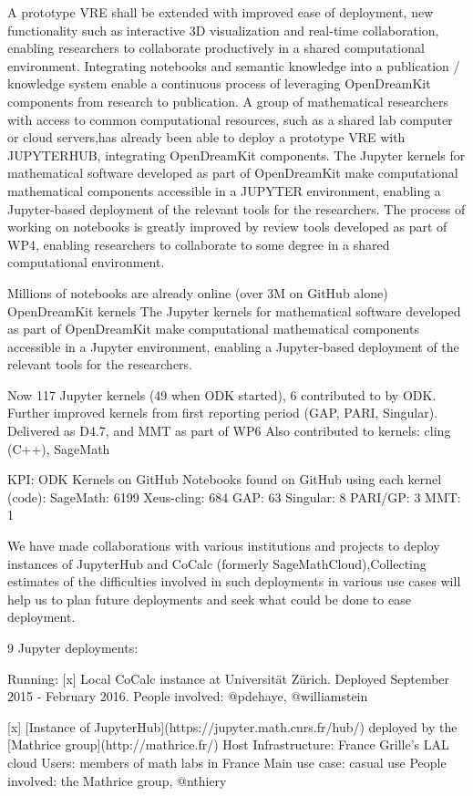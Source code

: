 \begin{Aim 1}
\begin{Aim 2}
\begin{itemize}
A prototype VRE shall be extended with improved ease of deployment, new functionality such as interactive 3D visualization and real-time 
collaboration, enabling researchers to collaborate productively in a shared computational environment. Integrating notebooks and semantic 
knowledge into a publication / knowledge system enable a continuous process of leveraging OpenDreamKit components from research to 
publication.
A group of mathematical researchers with access to common computational resources, such as a shared lab computer or cloud servers,has 
already been able to deploy a prototype VRE with JUPYTERHUB, integrating OpenDreamKit components. The Jupyter kernels for mathematical 
software developed as part of OpenDreamKit make computational mathematical components accessible in a JUPYTER environment, enabling a 
Jupyter-based deployment of the relevant tools for the researchers. The process of working on notebooks is greatly improved by review tools 
developed as part of WP4, enabling researchers to collaborate to some degree in a shared computational environment.

Millions of notebooks are already online (over 3M on GitHub alone)
OpenDreamKit kernels
The Jupyter kernels for mathematical software  developed as part of OpenDreamKit make computational mathematical components accessible in a 
Jupyter environment, enabling a Jupyter-based deployment of the relevant tools for the researchers.

Now 117 Jupyter kernels (49 when ODK started), 6 contributed to by ODK.
Further improved kernels from first reporting period (GAP, PARI, Singular). 
Delivered as D4.7, and MMT as part of WP6
Also contributed to kernels: cling (C++), SageMath

KPI: ODK Kernels on GitHub
Notebooks found on GitHub using each kernel (code):
SageMath: 6199
Xeus-cling: 684
GAP: 63
Singular: 8
PARI/GP: 3
MMT: 1

We have made collaborations with various institutions and projects to deploy instances of JupyterHub and CoCalc (formerly 
SageMathCloud),Collecting estimates of the difficulties involved in such deployments in various use cases will help us to plan future 
deployments and seek what could be done to ease deployment.
    
9 Jupyter deployments:

  Running:
  [x] Local CoCalc instance at Universität Zürich.
      Deployed September 2015 - February 2016.
      People involved: @pdehaye, @williamstein
      
  [x] [Instance of JupyterHub](https://jupyter.math.cnrs.fr/hub/) deployed by the [Mathrice group](http://mathrice.fr/)
      Host Infrastructure: France Grille's LAL cloud
      Users: members of math labs in France
      Main use case: casual use 
      People involved: the Mathrice group, @nthiery


\end{itemize}
\end{Aim 2}
\end{Aim 1}
